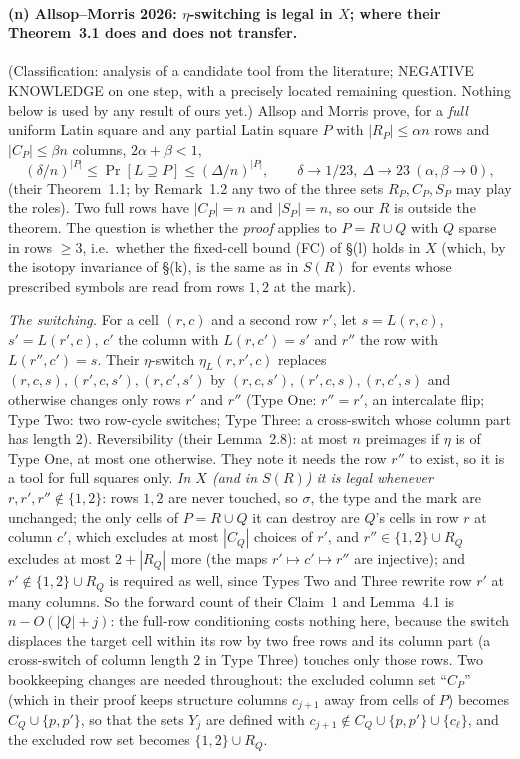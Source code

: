 \paragraph{(n) Allsop--Morris 2026: $\eta$-switching is legal in $X$;
where their Theorem~3.1 does and does not transfer.}  (Classification:
analysis of a candidate tool from the literature; NEGATIVE KNOWLEDGE
on one step, with a precisely located remaining question.  Nothing
below is used by any result of ours yet.)  Allsop and Morris
\cite{AM26} prove, for a \emph{full} uniform Latin square and any
partial Latin square $P$ with $|R_P|\le\alpha n$ rows and
$|C_P|\le\beta n$ columns, $2\alpha+\beta<1$,
\[
(\delta/n)^{|P|}\le\Pr[L\supseteq P]\le(\Delta/n)^{|P|},\qquad
\delta\to1/23,\ \Delta\to23\ (\alpha,\beta\to0),
\]
(their Theorem~1.1; by Remark~1.2 any two of the three sets
$R_P,C_P,S_P$ may play the roles).  Two full rows have $|C_P|=n$ and
$|S_P|=n$, so our $R$ is outside the theorem.  The question is whether
the \emph{proof} applies to $P=R\cup Q$ with $Q$ sparse in rows $\ge3$,
i.e.\ whether the fixed-cell bound (FC) of \S(l) holds in $X$ (which,
by the isotopy invariance of \S(k), is the same as in $S(R)$ for events
whose prescribed symbols are read from rows $1,2$ at the mark).

\emph{The switching.}  For a cell $(r,c)$ and a second row $r'$, let
$s=L(r,c)$, $s'=L(r',c)$, $c'$ the column with $L(r,c')=s'$ and $r''$ the
row with $L(r'',c')=s$.  Their $\eta$-switch $\eta_L(r,r',c)$ replaces
$(r,c,s),(r',c,s'),(r,c',s')$ by $(r,c,s'),(r',c,s),(r,c',s)$ and
otherwise changes only rows $r'$ and $r''$ (Type One: $r''=r'$, an
intercalate flip; Type Two: two row-cycle switches; Type Three: a
cross-switch whose column part has length $2$).  Reversibility
(their Lemma~2.8): at most $n$ preimages if $\eta$ is of Type One, at
most one otherwise.  They note it needs the row $r''$ to exist, so it is
a tool for full squares only.  \emph{In $X$ (and in $S(R)$) it is legal whenever
$r,r',r''\notin\{1,2\}$}: rows $1,2$ are never touched, so $\sigma$, the
type and the mark are unchanged; the only cells of $P=R\cup Q$ it can
destroy are $Q$'s cells in row $r$ at column $c'$, which excludes at
most $|C_Q|$ choices of $r'$, and $r''\in\{1,2\}\cup R_Q$ excludes at
most $2+|R_Q|$ more (the maps $r'\mapsto c'\mapsto r''$ are injective);
and $r'\notin\{1,2\}\cup R_Q$ is required as well, since Types Two and
Three rewrite row $r'$ at many columns.  So the forward count of their Claim~1 and
Lemma~4.1 is $n-O(|Q|+j)$: the full-row conditioning costs nothing
here, because the switch displaces the target cell within its row by
two free rows and its column part (a cross-switch of column length
$2$ in Type Three) touches only those rows.  Two bookkeeping changes
are needed throughout: the excluded column set ``$C_P$'' (which in
their proof keeps structure columns $c_{j+1}$ away from cells of $P$)
becomes $C_Q\cup\{p,p'\}$, so that the sets $Y_j$ are defined with
$c_{j+1}\notin C_Q\cup\{p,p'\}\cup\{c_\ell\}$, and the excluded row set
becomes $\{1,2\}\cup R_Q$.

